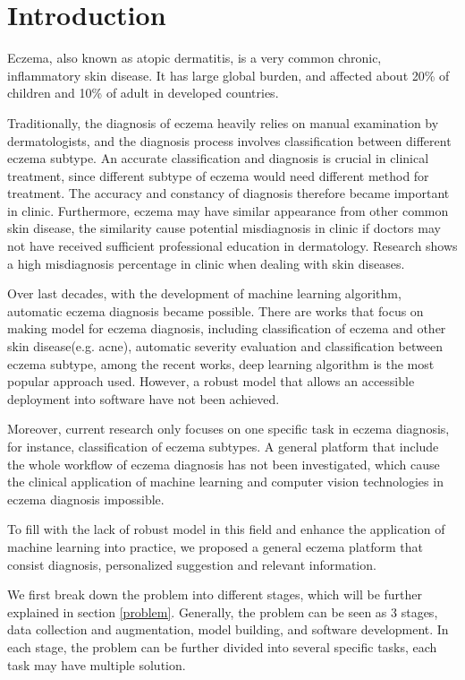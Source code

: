 \section{Introduction}

Eczema, also known as atopic dermatitis, is a very common chronic, inflammatory skin disease\cite{deckers2012investigating}. It has large global burden\cite{laughter2021global}, and affected about 20\% of children and 10\% of adult in developed countries\cite{odhiambo2009global}. 

Traditionally, the diagnosis of eczema heavily relies on manual examination by dermatologists, and the diagnosis process involves classification between different eczema subtype. An accurate classification and diagnosis is crucial in clinical treatment, since different subtype of eczema would need different method for treatment. The accuracy and constancy of diagnosis therefore became important in clinic\cite{ADD}. Furthermore, eczema may have similar appearance from other common skin disease, the similarity cause potential misdiagnosis in clinic if doctors may not have received sufficient professional education in dermatology. Research shows a high misdiagnosis percentage in clinic when dealing with skin diseases.

Over last decades, with the development of machine learning algorithm, automatic eczema diagnosis became possible. There are works that focus on making model for eczema diagnosis, including classification of eczema and other skin disease(e.g. acne), automatic severity evaluation and classification between eczema subtype, among the recent works, deep learning algorithm is the most popular approach used\cite{huang2024remote}. However, a robust model that allows an accessible deployment into software have not been achieved.

Moreover, current research only focuses on one specific task in eczema diagnosis, for instance, classification of eczema subtypes. A general platform that include the whole workflow of eczema diagnosis has not been investigated, which cause the clinical application of machine learning and computer vision technologies in eczema diagnosis impossible.

To fill with the lack of robust model in this field and enhance the application of machine learning into practice, we proposed a general eczema platform that consist diagnosis, personalized suggestion and relevant information. 

We first break down the problem into different stages, which will be further explained in section \ref{problem}. Generally, the problem can be seen as 3 stages, data collection and augmentation, model building, and software development. In each stage, the problem can be further divided into several specific tasks, each task may have multiple solution.

